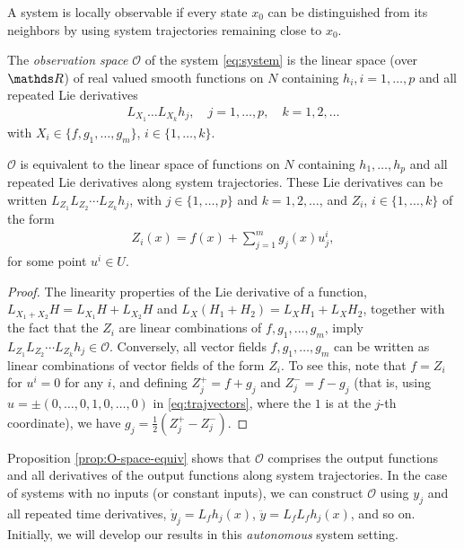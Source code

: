 A system is locally observable if every state $x_0$ can be distinguished from its neighbors by using system trajectories remaining close to $x_0$. 

\begin{defn}
    The \textit{observation space} $\mathscr{O}$ of the system \eqref{eq:system} is the linear space (over $\R$) of real valued smooth functions on $N$ containing $h_i, i = 1, \dots, p$ and all repeated Lie derivatives 
    \begin{align}
        L_{X_1}\dots L_{X_k}h_j, \quad j = 1,\dots, p, \quad k = 1,2, \dots
    \end{align}
    with $X_i \in \{f, g_1, \dots, g_m\}$, $i\in\{1, \dots, k\}$. 
\end{defn}

\begin{prop}\label{prop:O-space-equiv}
$\mathscr{O}$ is equivalent to the linear space of functions on $N$ containing $h_1, \dots, h_p$ and all repeated Lie derivatives along system trajectories. These Lie derivatives can be written $L_{Z_1}L_{Z_2}\cdots L_{Z_k}h_j$, with $j \in \{1, \dots, p\}$ and $k=1, 2, \dots$, and $Z_i$, $i\in \{1, \dots, k\}$ of the form
\begin{align}\label{eq:trajvectors}
Z_i(x) = f(x) + \sum_{j = 1}^{m}g_j(x)u_j^i,
\end{align} 
for some point $u^i \in U$. 
\end{prop}
\begin{proof}
The linearity properties of the Lie derivative of a function, $L_{X_1+X_2}H = L_{X_1}H+L_{X_2}H$ and $L_X(H_1+H_2) = L_XH_1 + L_XH_2$, together with the fact that the $Z_i$ are linear combinations of $f, g_1, \dots, g_m$, imply $L_{Z_1}L_{Z_2}\cdots L_{Z_k}h_j \in \mathscr{O}$. Conversely, all vector fields $f, g_1, \dots, g_m$ can be written as linear combinations of vector fields of the form $Z_i$. To see this, note that $f = Z_i$ for $u^i = 0$ for any $i$, and defining $Z_{j}^{+} = f+g_j$ and $Z_{j}^{-} = f-g_j$ (that is, using $u = \pm (0, \dots, 0, 1, 0, \dots, 0)$ in \eqref{eq:trajvectors}, where the $1$ is at the $j$-th coordinate), we have $g_j = \frac{1}{2}(Z_{j}^{+}-Z_{j}^{-})$.  
\end{proof}

Proposition \ref{prop:O-space-equiv} shows that $\mathscr{O}$ comprises the output functions and all derivatives of the output functions along system trajectories. In the case of systems with no inputs (or constant inputs), we can construct $\mathscr{O}$ using $y_j$ and all repeated time derivatives, $\dot y_j = L_fh_j(x)$, $\ddot y = L_fL_fh_j(x)$, and so on. Initially, we will develop our results in this \textit{autonomous} system setting. 

